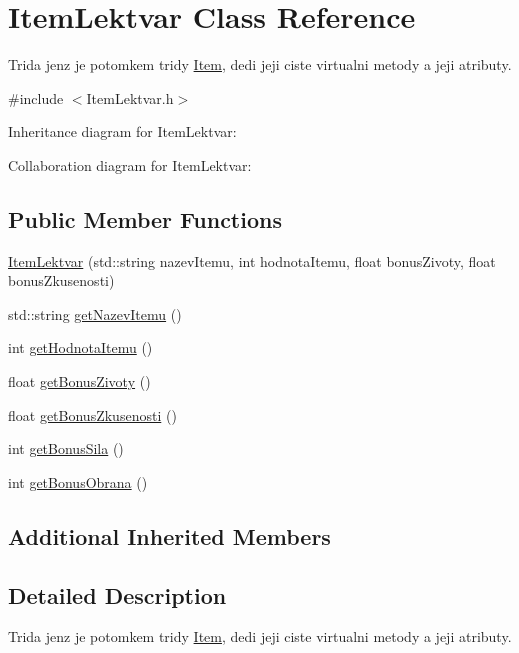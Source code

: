 \hypertarget{class_item_lektvar}{\section{Item\-Lektvar Class Reference}
\label{class_item_lektvar}
}


Trida jenz je potomkem tridy \hyperlink{class_item}{Item}, dedi jeji ciste virtualni metody a jeji atributy.  




{\ttfamily \#include $<$Item\-Lektvar.\-h$>$}



Inheritance diagram for Item\-Lektvar\-:


Collaboration diagram for Item\-Lektvar\-:
\subsection*{Public Member Functions}
\begin{DoxyCompactItemize}
\item 
\hyperlink{class_item_lektvar_a49955110b7ae94546a954067c9ece580}{Item\-Lektvar} (std\-::string nazev\-Itemu, int hodnota\-Itemu, float bonus\-Zivoty, float bonus\-Zkusenosti)
\item 
std\-::string \hyperlink{class_item_lektvar_a4d29516a28d6e5f14450376646675edd}{get\-Nazev\-Itemu} ()
\item 
int \hyperlink{class_item_lektvar_a260bbc80f2458b7f34a2a394783786c8}{get\-Hodnota\-Itemu} ()
\item 
float \hyperlink{class_item_lektvar_a51b8769248452d811bf04cb9b4b81d2b}{get\-Bonus\-Zivoty} ()
\item 
float \hyperlink{class_item_lektvar_a93544ac093998897aec4f59e9a27c5d5}{get\-Bonus\-Zkusenosti} ()
\item 
int \hyperlink{class_item_lektvar_af9cb7e14cf2c89a440a4801c50d3fd7d}{get\-Bonus\-Sila} ()
\item 
int \hyperlink{class_item_lektvar_a0e98e5ebef2a60d2df4dcac1e1e6354a}{get\-Bonus\-Obrana} ()
\end{DoxyCompactItemize}
\subsection*{Additional Inherited Members}


\subsection{Detailed Description}
Trida jenz je potomkem tridy \hyperlink{class_item}{Item}, dedi jeji ciste virtualni metody a jeji atributy. 

